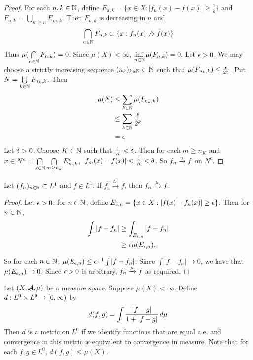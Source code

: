 \documentclass{book}
\begin{document}
	\begin{proof}
		For each $n, k \in \mathbb{N}$, define $E_{n, k} = \{x \in X: | f_n(x) - f(x) | \geq \frac{1}{k} \}$ and $F_{n,k} = \bigcup\limits_{m \geq n}E_{m,k}$. Then $F_{n,k}$ is decreasing in $n$ and $$\bigcap\limits_{n \in \mathbb{N}}F_{n,k} \subset \{x: f_n(x) \not \rightarrow f(x)\}$$ 
		Thus $\mu(\bigcap\limits_{n \in \mathbb{N}}F_{n,k}) = 0$. Since $\mu(X) < \infty$, $\inf\limits_{n \in \mathbb{N}}\mu(F_{n,k}) = 0$. Let $\epsilon >0$. We may choose a strictly increasing sequence $(n_k)_{k \in \mathbb{N}} \subset \mathbb{N}$ such that  $\mu(F_{n_k,k}) \leq \frac{\epsilon}{2^{k}}$. Put $N = \bigcup\limits_{k \in \mathbb{N}}F_{n_k,k}$. Then 
		\begin{align*}
			\mu(N) 
			&\leq \sum\limits_{k \in \mathbb{N}}\mu(F_{n_k,k}) \\
			& \leq \sum\limits_{k \in \mathbb{N}} \frac{\epsilon}{2^k}\\
			& = \epsilon
		\end{align*} 
		Let $\delta > 0$. Choose $K \in \mathbb{N}$ such that $\frac{1}{K} < \delta$. Then for each $m \geq n_K$ and $x \in N^c =\bigcap\limits_{k \in \mathbb{N}}\bigcap\limits_{m \geq n_k}E_{m,k}^c$, $|f_m(x)- f(x)| < \frac{1}{K} < \delta$. So $f_n \xrightarrow{\text{u}} f$ on $N^c$. 
	\end{proof}
	
	\begin{ex}  
		Let $(f_n)_{n \in \mathbb{N}} \subset L^1$ and $f \in L^1$. If $f_n \xrightarrow{L^1}f$, then $f_n \xrightarrow{\mu} f$.
	\end{ex}
	
	\begin{proof}
		Let $\epsilon >0$. for $n \in \mathbb{N}$, define $E_{e,n} = \{x \in X: |f(x) - f_n(x)|\geq \epsilon\}$. Then for $n \in \mathbb{N}$,
		\begin{align*}
			\int |f - f_n|
			& \geq \int_{E_{\epsilon,n}} |f- f_n|\\
			& \geq \epsilon \mu(E_{\epsilon,n}).
		\end{align*}
		
		So for each $n \in \mathbb{N}$, $\mu(E_{\epsilon, n}) \leq \epsilon^{-1}\int |f - f_n|$. Since $\int |f - f_n| \rightarrow 0$, we have that $\mu(E_{\epsilon,n}) \rightarrow 0$. Since $\epsilon >0$ is arbitrary, $f_n \xrightarrow{\mu} f$ as required. 
	\end{proof}
	
	\begin{ex}  
		Let $(X, \mathcal{A}, \mu)$ be a measure space. Suppose $\mu(X) < \infty$. Define $d:L^0 \times L^0 \rightarrow [0,\infty)$ by $$d(f,g) = \int \frac{|f-g|}{1+|f-g|} \, d \mu $$
		Then $d$ is a metric on $L^0$ if we identify functions that are equal a.e. and convergence in this metric is equivalent to convergence in measure. Note that for each $f,g \in L^0$, $d(f,g) \leq \mu(X)$.
	\end{ex} 
	
\end{document}
